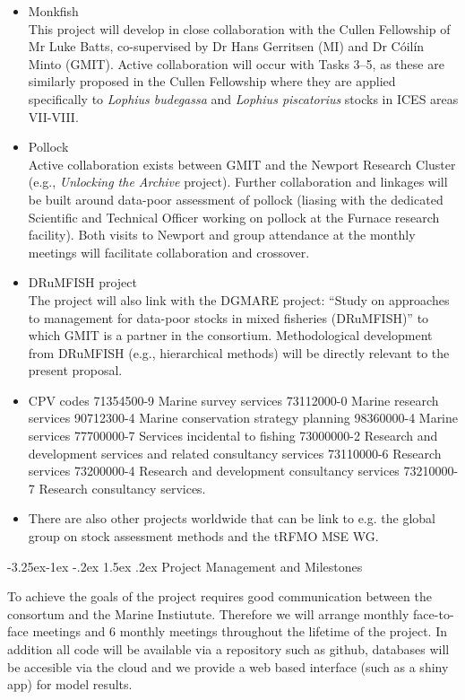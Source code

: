 \documentclass[a4paper, 10pt]{article}
\makeatletter
\renewcommand{\subsection}{\@startsection{subsection}{2}{\z@}%
  {-3.25ex\@plus -1ex \@minus -.2ex}%
  {1.5ex \@plus .2ex}%
  {\normalfont\bfseries\slshape}}
\makeatother
\begin{document}
 \begin{itemize}
  \item Monkfish\\
  This project will develop in close collaboration with the Cullen Fellowship of Mr Luke Batts, co-supervised by Dr Hans Gerritsen (MI) and Dr C\'oil\'in Minto (GMIT). Active collaboration will occur with Tasks 3--5, as these are similarly proposed in the Cullen Fellowship where they are applied specifically to \textit{Lophius budegassa} and \textit{Lophius piscatorius} stocks in ICES areas VII-VIII.
  \item Pollock \\
  Active collaboration exists between GMIT and the Newport Research Cluster (e.g., \emph{Unlocking the Archive} project). Further collaboration and linkages will be built around data-poor assessment of pollock (liasing with the dedicated Scientific and Technical Officer working on pollock at the Furnace research facility). Both visits to Newport and group attendance at the monthly meetings will facilitate collaboration and crossover.
  \item DRuMFISH project \\
  The project will also link with the DGMARE project: ``Study on approaches to management for data-poor stocks in mixed fisheries (DRuMFISH)'' to which GMIT is a partner in the consortium. Methodological development from DRuMFISH (e.g., hierarchical methods) will be directly relevant to the present proposal. 
  \item CPV codes 71354500-9 Marine survey services 73112000-0 Marine research services 90712300-4 Marine conservation strategy planning 98360000-4 Marine services 77700000-7 Services incidental to fishing 73000000-2 Research and development services and related consultancy services 73110000-6 Research services 73200000-4 Research and development consultancy services 73210000-7 Research consultancy services.
  \item There are also other projects worldwide that can be link to e.g. the global group on stock assessment methods and the tRFMO MSE WG.  
 \end{itemize}



\newpage\subsection{Project Management and Milestones}

To achieve the goals of the project requires good communication between the consortum and the Marine Instiutute. Therefore we will arrange monthly face-to-face meetings and 6 monthly meetings throughout the lifetime of the project. In addition all code will be available via a repository such as github, databases will be accesible via the cloud and we provide a web based interface (such as a shiny app) for model results.
\end{document}
